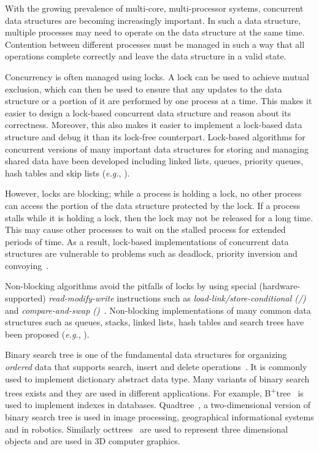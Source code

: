 With the growing prevalence of multi-core, multi-processor systems, concurrent data structures are becoming increasingly important. In such a data structure, multiple processes may need to operate on the data structure at the same time. Contention between different processes must be managed in such a way that all operations complete correctly and leave the data structure in a valid state.

Concurrency is often managed using locks. A lock can be used to achieve mutual exclusion, which can then be used to ensure that any updates to the data structure or a portion of it are performed by one process at a time. This makes it easier to design a lock-based concurrent data structure and reason about its correctness. Moreover, this also makes it easier to implement a lock-based data structure and debug it than its lock-free counterpart. Lock-based algorithms for concurrent versions of many important data structures for storing and managing shared data have been developed including linked lists, queues, priority queues, hash tables and skip lists (\emph{e.g.}, \cite{MicSco:1996:PODC, Mic:2002:SPAA,Lea:2003:JSR166,HelHer+:2005:OPODIS,LevHer+:2007:SIROCCO, HerSha:2012:Book}).

However, locks are blocking; while a process is holding a lock, no other process can access the portion of the data structure protected by the lock. If a process stalls while it is holding a lock, then the lock may not be released for a long time. This may cause other processes to wait on the stalled process for extended periods of time. As a result, lock-based implementations of concurrent data structures are vulnerable to problems such as deadlock, priority inversion and convoying~\cite{HerSha:2012:Book}.

Non-blocking algorithms avoid the pitfalls of locks by using special (hardware-supported) \emph{read-modify-write} instructions such as \emph{load-link/store-conditional (\LL{}/\SC{})}  and \linebreak \emph{compare-and-swap (\CAS{})}~\cite{HerSha:2012:Book}. Non-blocking implementations of many common data structures such as queues, stacks, linked lists, hash tables and search trees  have been proposed (\emph{e.g.}, \cite{Mic:2002:SPAA,FomRup:2004:PODC,BenFin+:2005:SPAA,EllFat+:2010:PODC,HerSha:2012:Book,BraPet:2012:SPAA,HowJon:2012:SPAA,NatMit:2013:DISC,NatSav+:2013:SSS,NatMit:2014:PPoPP,DraVec+:2014:PPoPP,EllFat+:2014:PODC}).

Binary search tree is one of the fundamental data structures for organizing \emph{ordered} data that supports search, insert and delete operations~\cite{CorLei+:1991:MIT}. It is commonly used to implement dictionary abstract data type. Many variants of binary search trees exists and they are used in different applications. For example, B\textsuperscript{+}tree~\cite{Comer:1979} is used to implement indexes in databases. Quadtree~\cite{FinBen:1974}, a two-dimensional version of binary search tree is used in image processing, geographical informational systems and in robotics. Similarly octtrees~\cite{JacTan:1980} are used to represent three dimensional objects and are used in 3D computer graphics.

